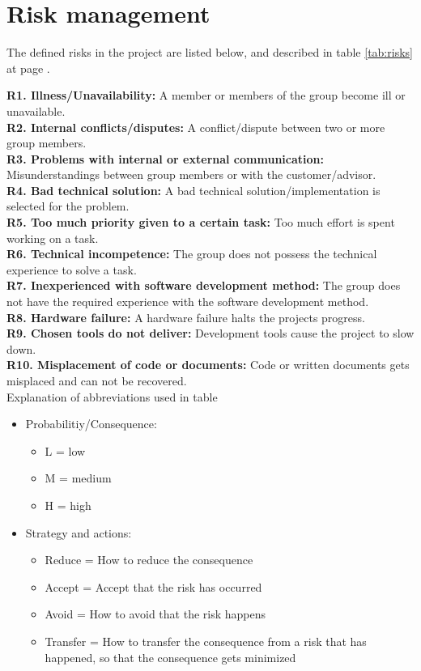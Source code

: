 

\section{Risk management}

The defined risks in the project are listed below, and described in table \ref{tab:risks} at page \pageref{tab:risks}.
\newline

\textbf{R1. Illness/Unavailability:} A member or members of the group become ill or unavailable. \\
\textbf{R2. Internal conflicts/disputes:} A conflict/dispute between two or more group members. \\
\textbf{R3. Problems with internal or external communication:} Misunderstandings between group members or with the customer/advisor. \\
\textbf{R4. Bad technical solution:} A bad technical solution/implementation is selected for the problem. \\
\textbf{R5. Too much priority given to a certain task:} Too much effort is spent working on a task. \\
\textbf{R6. Technical incompetence:} The group does not possess the technical experience to solve a task. \\
\textbf{R7. Inexperienced with software development method:} The group does not have the required experience with the software development method. \\
\textbf{R8. Hardware failure:} A hardware failure halts the projects progress. \\
\textbf{R9. Chosen tools do not deliver:} Development tools cause the project to slow down. \\
\textbf{R10. Misplacement of code or documents:} Code or written documents gets misplaced and can not be recovered. \\

Explanation of abbreviations used in table%
\begin{itemize}
\item{}Probabilitiy/Consequence:
\begin{itemize}
\item{}L = low
\item{}M = medium
\item{}H = high
\end{itemize}
\item{}Strategy and actions:
\begin{itemize}
\item{}Reduce = How to reduce the consequence
\item{}Accept = Accept that the risk has occurred
\item{}Avoid = How to avoid that the risk happens
\item{}Transfer = How to transfer the consequence from a risk that has happened, so that the consequence gets minimized
\end{itemize}
\end{itemize}








